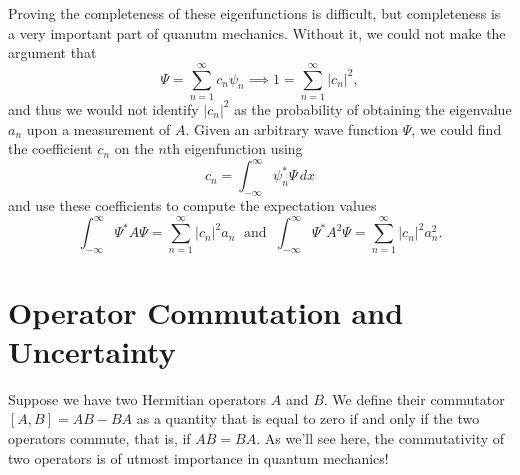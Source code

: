 \documentclass[../p052main.tex]{subfiles}
\begin{document}
Proving the completeness of these eigenfunctions is difficult, but completeness is a very important part of quanutm mechanics.
Without it, we could not make the argument that
\[ \Psi = \sum_{n=1}^{\infty} c_n \psi_n \implies 1 = \sum_{n=1}^{\infty} |c_n|^2, \]
and thus we would not identify $|c_n|^2$ as the probability of obtaining the eigenvalue $a_n$ upon a measurement of $A$.
Given an arbitrary wave function $\Psi$, we could find the coefficient $c_n$ on the $n$th eigenfunction using
\[ c_n = \int_{-\infty}^{\infty} \psi_n^* \Psi \,dx \]
and use these coefficients to compute the expectation values
\[ \int_{-\infty}^{\infty} \Psi^* A \Psi = \sum_{n=1}^{\infty} |c_n|^2 a_n \;\text{ and }\; \int_{-\infty}^{\infty} \Psi^* A^2 \Psi = \sum_{n=1}^{\infty} |c_n|^2 a_n^2. \]



\section{Operator Commutation and Uncertainty}
Suppose we have two Hermitian operators $A$ and $B$.
We define their commutator $[A,B] = AB - BA$ as a quantity that is equal to zero if and only if the two operators commute, that is, if $AB = BA$.
As we'll see here, the commutativity of two operators is of utmost importance in quantum mechanics!
\end{document}
